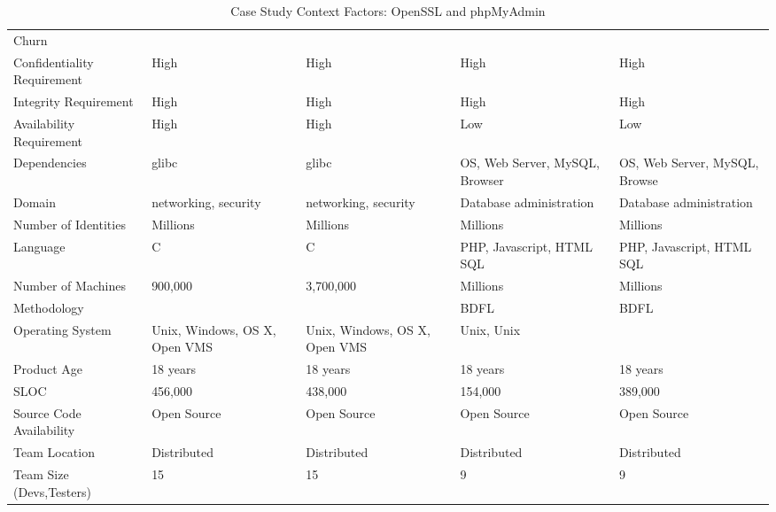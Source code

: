 \begin{table*}
	\begin{center}	
		\caption{Case Study Context Factors: OpenSSL and phpMyAdmin}
		\begin{tiny}	
			\begin{tabular}{|l|l|l||l|l|}
				Churn & & & & \\
				Confidentiality Requirement & High & High & High  & High \\
				Integrity Requirement & High & High & High  & High \\
				Availability Requirement & High & High & Low  & Low \\
				Dependencies & glibc & glibc & OS, Web Server, MySQL, Browser &  OS, Web Server, MySQL, Browse \\
				Domain & networking, security & networking, security & Database administration & Database administration \\
				Number of Identities & Millions & Millions & Millions & Millions \\
				Language & C & C & PHP, Javascript, HTML SQL & PHP, Javascript, HTML SQL \\
				Number of Machines & 900,000 & 3,700,000 & Millions & Millions \\
				Methodology & & & BDFL & BDFL \\
				Operating System & Unix, Windows, OS X, Open VMS & Unix, Windows, OS X, Open VMS & Unix, Unix \\
				Product Age & 18 years & 18 years & 18 years & 18 years \\
				SLOC & 456,000 & 438,000 & 154,000 & 389,000 \\
				Source Code Availability &  Open Source &  Open Source &  Open Source &  Open Source \\
				Team Location & Distributed  & Distributed  & Distributed  & Distributed \\
				Team Size (Devs,Testers) & 15  & 15 & 9 & 9 \\
			\end{tabular}
			
			\label{tab:CAO_SCTO_Table}
		\end{tiny}
	\end{center}
\end{table*}

